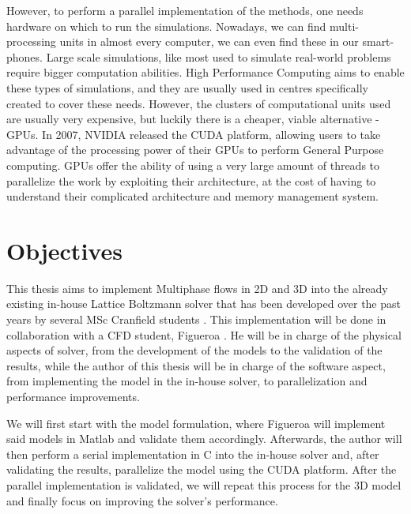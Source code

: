 \documentclass[12pt, openany]{book}
\begin{document}
However, to perform a parallel implementation of the methods, one needs hardware on which to run the simulations. Nowadays, we can find multi-processing units in almost every computer, we can even find these in our smart-phones. Large scale simulations, like most used to simulate real-world problems require bigger computation abilities. High Performance Computing aims to enable these types of simulations, and they are usually used in centres specifically created to cover these needs. However, the clusters of computational units used are usually very expensive, but luckily there is a cheaper, viable alternative - GPUs. In 2007, NVIDIA released the CUDA platform, allowing users to take advantage of the processing power of their GPUs to perform General Purpose computing. GPUs offer the ability of using a very large amount of threads to parallelize the work by exploiting their architecture, at the cost of having to understand their complicated architecture and memory management system. \par

\section{Objectives}
This thesis aims to implement Multiphase flows in 2D and 3D into the already existing in-house Lattice Boltzmann solver that has been developed over the past years by several MSc Cranfield students  \cite{maciej_thesis,koleszar_thesis,jozsa_thesis,szoke_thesis}. This implementation will be done in collaboration with a CFD student, Figueroa \cite{antonioThesis}. He will be in charge of the physical aspects of solver, from the development of the models to the validation of the results, while the author of this thesis will be in charge of the software aspect, from implementing the model in the in-house solver, to parallelization and performance improvements. \par
We will first start with the model formulation, where Figueroa will implement said models in Matlab and validate them accordingly. Afterwards, the author will then perform a serial implementation in C into the in-house solver and, after validating the results, parallelize the model using the CUDA platform. After the parallel implementation is validated, we will repeat this process for the 3D model and finally focus on improving the solver's performance. 
\end{document}
